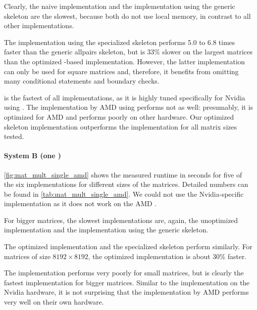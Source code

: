 Clearly, the naive \OpenCL implementation and the implementation using the generic \allpairs skeleton are the slowest, because both do not use local memory, in contrast to all other implementations.

The implementation using the specialized \allpairs skeleton performs 5.0 to 6.8 times faster than the generic allpairs skeleton, but is 33\% slower on the largest matrices than the optimized \OpenCL-based implementation. %
However, the latter implementation can only be used for square matrices and, therefore, it benefits from omitting many conditional statements and boundary checks.


\CUBLAS is the fastest of all implementations, as it is highly tuned specifically for Nvidia \GPUs using \CUDA.
The \clBLAS implementation by AMD using \OpenCL performs not as well:
presumably, it is optimized for AMD \GPUs and performs poorly on other hardware.
Our optimized \allpairs skeleton implementation outperforms the \clBLAS implementation for all matrix sizes tested.


\pagebreak

\paragraph{System B (one \GPU)}
\autoref{fig:mat_mult_single_amd} shows the measured runtime in seconds for five of the six implementations for different sizes of the matrices.
Detailed numbers can be found in \autoref{tab:mat_mult_single_amd}.
We could not use the Nvidia-specific \CUBLAS implementation as it does not work on the AMD \GPU.

For bigger matrices, the slowest implementations are, again, the unoptimized \OpenCL implementation and the implementation using the generic \allpairs skeleton.

The optimized \OpenCL implementation and the specialized \allpairs skeleton perform similarly.
For matrices of size $8192\times 8192$, the optimized \OpenCL implementation is about 30\% faster.

The \clBLAS implementation performs very poorly for small matrices, but is clearly the fastest implementation for bigger matrices.
Similar to the \CUBLAS implementation on the Nvidia hardware, it is not surprising that the implementation by AMD performs very well on their own hardware.

